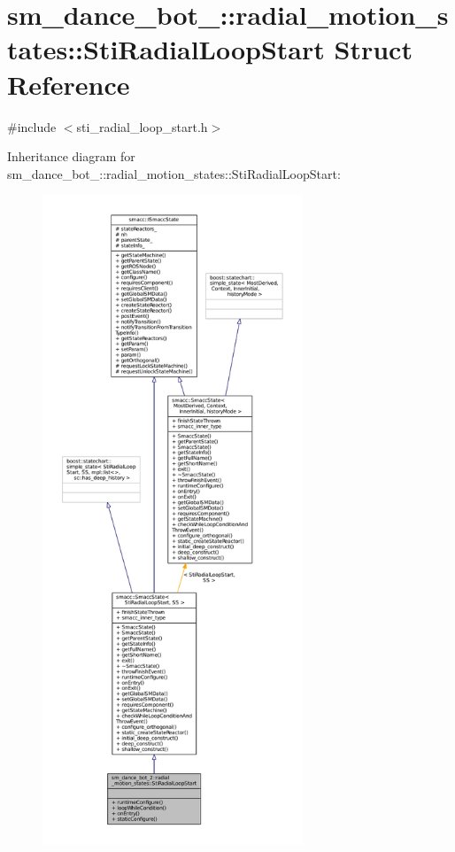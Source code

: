 \hypertarget{structsm__dance__bot__2_1_1radial__motion__states_1_1StiRadialLoopStart}{}\section{sm\+\_\+dance\+\_\+bot\+\_\+:\+:radial\+\_\+motion\+\_\+states\+:\+:Sti\+Radial\+Loop\+Start Struct Reference}
\label{structsm__dance__bot__2_1_1radial__motion__states_1_1StiRadialLoopStart}


{\ttfamily \#include $<$sti\+\_\+radial\+\_\+loop\+\_\+start.\+h$>$}



Inheritance diagram for sm\+\_\+dance\+\_\+bot\+\_\+:\+:radial\+\_\+motion\+\_\+states\+:\+:Sti\+Radial\+Loop\+Start\+:
\nopagebreak
\begin{figure}[H]
\begin{center}
\leavevmode
\includegraphics[height=550pt]{structsm__dance__bot__2_1_1radial__motion__states_1_1StiRadialLoopStart__inherit__graph}
\end{center}
\end{figure}


